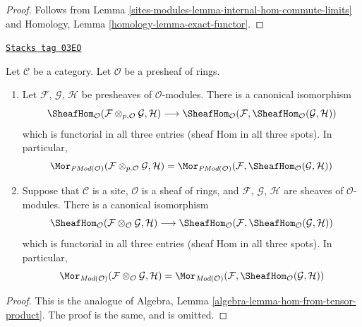 \begin{proof}
Follows from Lemma \ref{sites-modules-lemma-internal-hom-commute-limits} and
Homology, Lemma \ref{homology-lemma-exact-functor}.
\end{proof}

\begin{lemma}
\label{sites-modules-lemma-internal-hom-adjoint-tensor}
\href{https://stacks.math.columbia.edu/tag/03EO}{\texttt{Stacks tag 03EO}}

Let $\mathcal{C}$ be a category. Let $\mathcal{O}$ be a presheaf of
rings.
\begin{enumerate}
\item Let $\mathcal{F}$, $\mathcal{G}$, $\mathcal{H}$ be
presheaves of $\mathcal{O}$-modules. There is a canonical isomorphism
$$
\SheafHom_\mathcal{O}
(\mathcal{F} \otimes_{p, \mathcal{O}} \mathcal{G}, \mathcal{H})
\longrightarrow
\SheafHom_\mathcal{O}
(\mathcal{F}, \SheafHom_\mathcal{O}(\mathcal{G}, \mathcal{H}))
$$
which is functorial in all three entries (sheaf Hom in
all three spots). In particular,
$$
\Mor_{\textit{PMod}(\mathcal{O})}(
\mathcal{F} \otimes_{p, \mathcal{O}} \mathcal{G}, \mathcal{H})
=
\Mor_{\textit{PMod}(\mathcal{O})}(
\mathcal{F}, \SheafHom_\mathcal{O}(\mathcal{G}, \mathcal{H}))
$$
\item
Suppose that $\mathcal{C}$ is a site, $\mathcal{O}$ is a sheaf of rings,
and $\mathcal{F}$, $\mathcal{G}$, $\mathcal{H}$ are sheaves of
$\mathcal{O}$-modules. There is a canonical isomorphism
$$
\SheafHom_\mathcal{O}
(\mathcal{F} \otimes_\mathcal{O} \mathcal{G}, \mathcal{H})
\longrightarrow
\SheafHom_\mathcal{O}
(\mathcal{F}, \SheafHom_\mathcal{O}(\mathcal{G}, \mathcal{H}))
$$
which is functorial in all three entries (sheaf Hom in
all three spots). In particular,
$$
\Mor_{\textit{Mod}(\mathcal{O})}(
\mathcal{F} \otimes_\mathcal{O} \mathcal{G}, \mathcal{H})
=
\Mor_{\textit{Mod}(\mathcal{O})}(
\mathcal{F}, \SheafHom_\mathcal{O}(\mathcal{G}, \mathcal{H}))
$$
\end{enumerate}
\end{lemma}

\begin{proof}
This is the analogue of
Algebra, Lemma \ref{algebra-lemma-hom-from-tensor-product}.
The proof is the same, and is omitted.
\end{proof}

